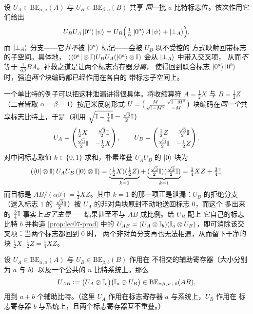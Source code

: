 \begin{remark}[朴素堆叠为何失败]
\label{rem:lec07-naive}
设 $U_A\in\mathrm{BE}_{\alpha,a}(A)$ 与 $U_B\in\mathrm{BE}_{\beta,a}(B)$ 共享
\emph{同一}批 $a$ 比特标志位。依次作用它们给出
\[
  U_B U_A\ket{0^a}\ket\psi
  =U_B\Bigl(\tfrac{1}{\alpha}\ket{0^a}A\ket\psi+\ket{\perp_A}\Bigr),
\]
而 $\ket{\perp_A}$ 分支——它\emph{并不}被 $\ket{0^a}$ 标记——会被 $U_B$ 以不受控的
方式映射回带标志的子空间。具体地，
$(\bra{0^a}\otimes\mathbb{I})U_BU_A(\ket{0^a}\otimes\mathbb{I})$ 会从 $\ket{\perp_A}$ 中带入交叉项，
从而\emph{不}等于 $\frac{1}{\alpha\beta}BA$。补救之道是让两个标志寄存器\emph{分离}，
使得回到联合标志 $\ket{0^{a}}\ket{0^{b}}$ 时，强迫\emph{两个}块编码都已经作用在各自的
带标志子空间上。

一个单比特的例子可以把这种泄漏讲得很具体。将收缩算符 $A=\tfrac12 X$ 与 $B=\tfrac12 Z$
（二者皆取 $\alpha=\beta=1$）按厄米反射形式
$U=\bigl(\begin{smallmatrix}M & \sqrt{\mathbb{I}-M^2}\\ \sqrt{\mathbb{I}-M^2} & -M\end{smallmatrix}\bigr)$
块编码在\emph{同一个}共享标志比特上，于是（利用 $\sqrt{\mathbb{I}-\tfrac14\mathbb{I}}=\tfrac{\sqrt3}{2}\mathbb{I}$）
\[
  U_A=\begin{pmatrix}\tfrac12 X & \tfrac{\sqrt3}{2}\mathbb{I}\\[2pt] \tfrac{\sqrt3}{2}\mathbb{I} & -\tfrac12 X\end{pmatrix},
  \qquad
  U_B=\begin{pmatrix}\tfrac12 Z & \tfrac{\sqrt3}{2}\mathbb{I}\\[2pt] \tfrac{\sqrt3}{2}\mathbb{I} & -\tfrac12 Z\end{pmatrix}.
\]
对中间标志取值 $k\in\{0,1\}$ 求和，朴素堆叠 $U_AU_B$ 的 $\ket0$ 块为
\[
  (\bra0\otimes\mathbb{I})\,U_AU_B\,(\ket0\otimes\mathbb{I})
  =\underbrace{(\tfrac12 X)(\tfrac12 Z)}_{k=0}
  +\underbrace{(\tfrac{\sqrt3}{2}\mathbb{I})(\tfrac{\sqrt3}{2}\mathbb{I})}_{k=1}
  =\tfrac14 XZ+\tfrac34\mathbb{I},
\]
而目标是 $AB/(\alpha\beta)=\tfrac14 XZ$。其中 $k=1$ 的那一项正是泄漏：$U_B$ 的拒绝分支
（送入标志 $1$ 的 $\tfrac{\sqrt3}{2}\mathbb{I}$）被 $U_A$ 的非对角块原封不动地送回标志 $0$，而这个
多出来的 $\tfrac34\mathbb{I}$ 事实上\emph{占了主导}——结果甚至不与 $AB$ 成比例。给 $U_B$ 配上
它自己的标志比特 $b$ 并构造 \cref{prop:lec07-prod} 中的
$U_{AB}=(U_A\otimes\mathbb{I}_b)(\mathbb{I}_a\otimes U_B)$，即可消除该交叉项：当两个标志都回到 $0$ 时，
两个非对角分支再也无法相遇，从而留下干净的块 $\tfrac12 X\cdot\tfrac12 Z=\tfrac14 XZ$。
\end{remark}

\begin{proposition}[两个块编码矩阵之积]
\label{prop:lec07-prod}
设 $U_A\in\mathrm{BE}_{\alpha,a}(A)$ 与 $U_B\in\mathrm{BE}_{\beta,b}(B)$ 作用在
不相交的辅助寄存器（大小分别为 $a$ 与 $b$）以及一个公共的 $n$ 比特系统上。那么
\begin{equation}
  U_{AB}\vcentcolon=\bigl(U_A\otimes\mathbb{I}_b\bigr)\bigl(\mathbb{I}_a\otimes U_B\bigr)
  \in\mathrm{BE}_{\alpha\beta,\,a+b}(AB),
  \label{eq:lec07-prod}
\end{equation}
用到 $a+b$ 个辅助比特。（这里 $U_A$ 作用在标志寄存器 $a$ 与系统上，$U_B$ 作用在
标志寄存器 $b$ 与系统上，且两个标志寄存器互不重叠。）
\end{proposition}

